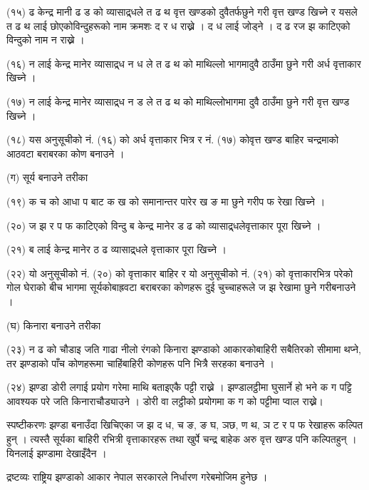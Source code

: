 (१५) ढ केन्द्र मानी ढ ड को व्यासाद्र्धले त ढ थ वृत्त खण्डको दुवैतर्फछुने गरी वृत्त खण्ड खिच्ने र यसले त ढ थ लाई छोएकोविन्दुहरूको नाम क्रमशः द र ध राख्ने । द ध लाई जोड्ने । द ढ रज झ काटिएको विन्दुको नाम न राख्ने ।

(१६) न लाई केन्द्र मानेर व्यासाद्र्ध न ध ले त ढ थ को माथिल्लो भागमादुवै ठाउँमा छुने गरी अर्ध वृत्ताकार खिच्ने ।

(१७) न लाई केन्द्र मानेर व्यासाद्र्ध न ड ले त ढ थ को माथिल्लोभागमा दुवै ठाउँमा छुने गरी वृत्त खण्ड खिच्ने ।

(१८) यस अनुसूचीको नं. (१६) को अर्ध वृत्ताकार भित्र र नं. (१७) कोवृत्त खण्ड बाहिर चन्द्रमाको आठवटा बराबरका कोण बनाउने ।

(ग) सूर्य बनाउने तरीका

(१९) क च को आधा प बाट क ख को समानान्तर पारेर ख ङ मा छुने गरीप फ रेखा खिच्ने ।

(२०) ज झ र प फ काटिएको विन्दु ब केन्द्र मानेर ड ढ को व्यासाद्र्धलेवृत्ताकार पूरा खिच्ने ।

(२१) ब लाई केन्द्र मानेर ठ ढ व्यासाद्र्धले वृत्ताकार पूरा खिच्ने ।

(२२) यो अनुसूचीको नं. (२०) को वृत्ताकार बाहिर र यो अनुसूचीको नं. (२१) को वृत्ताकारभित्र परेको गोल घेराको बीच भागमा सूर्यकोबाह्रवटा बराबरका कोणहरू दुई चुच्चाहरूले ज झ रेखामा छुने गरीबनाउने ।

(घ) किनारा बनाउने तरीका

(२३) न ढ को चौडाइ जति गाढा नीलो रंगको किनारा झण्डाको आकारकोबाहिरी सबैतिरको सीमामा थप्ने, तर झण्डाको पाँच कोणहरूमा चाहिंबाहिरी कोणहरू पनि भित्रै सरहका बनाउने ।

(२४) झण्डा डोरी लगाई प्रयोग गरेमा माथि बताइएकै पट्टी राख्ने । झण्डालट्ठीमा घुसार्ने हो भने क ग पट्टि आवश्यक परे जति किनाराचौड्याउने । डोरी वा लट्ठीको प्रयोगमा क ग को पट्टीमा प्वाल राख्ने।

स्पष्टीकरणः झण्डा बनाउँदा खिचिएका ज झ द ध, च ङ, ङ घ, ञछ, ण थ, ञ ट र प फ रेखाहरू कल्पित हुन् । त्यस्तै सूर्यका बाहिरी रभित्री वृत्ताकारहरू तथा खुर्पे चन्द्र बाहेक अरु वृत्त खण्ड पनि कल्पितहुन् । यिनलाई झण्डामा देखाइँदैन ।

द्रष्टव्यः राष्ट्रिय झण्डाको आकार नेपाल सरकारले निर्धारण गरेबमोजिम हुनेछ ।

 